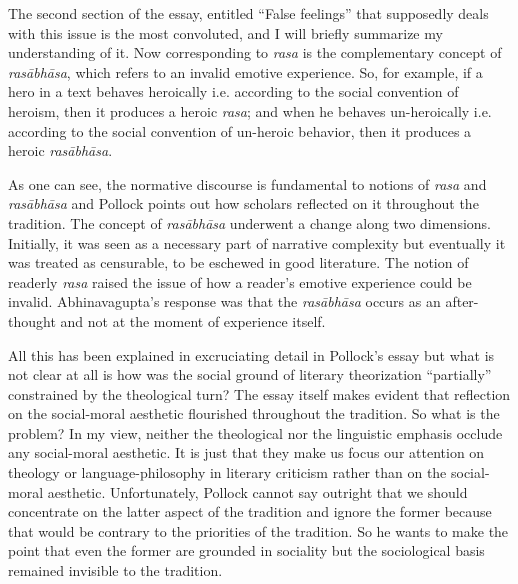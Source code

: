 The second section of the essay, entitled ``False feelings'' that supposedly deals with this issue is the most convoluted, and I will briefly summarize my understanding of it. Now corresponding to \textsl{rasa} is the complementary concept of \textsl{rasābhāsa}, which refers to an invalid emotive experience. So, for example, if a hero in a text behaves heroically i.e. according to the social convention of heroism, then it produces a heroic \textsl{rasa}; and when he behaves un-heroically i.e. according to the social convention of un-heroic behavior, then it produces a heroic \textsl{rasābhāsa}. 

As one can see, the normative discourse is fundamental to notions of \textsl{rasa} and \textsl{rasābhāsa} and Pollock points out how scholars reflected on it throughout the tradition. The concept of \textsl{rasābhāsa} underwent a change along two dimensions. Initially, it was seen as a necessary part of narrative complexity but eventually it was treated as censurable, to be eschewed in good literature. The notion of readerly \textsl{rasa} raised the issue of how a reader's emotive experience could be invalid. Abhinavagupta's response was that the \textsl{rasābhāsa} occurs as an after-thought and not at the moment of experience itself.

All this has been explained in excruciating detail in Pollock's essay but what is not clear at all is how was the social ground of literary theorization ``partially'' constrained by the theological turn? The essay itself makes evident that reflection on the social-moral aesthetic flourished throughout the tradition. So what is the problem? In my view, neither the theological nor the linguistic emphasis occlude any social-moral aesthetic. It is just that they make us focus our attention on theology or language-philosophy in literary criticism rather than on the social-moral aesthetic. Unfortunately, Pollock cannot say outright that we should concentrate on the latter aspect of the tradition and ignore the former because that would be contrary to the priorities of the tradition. So he wants to make the point that even the former are grounded in sociality but the sociological basis remained invisible to the tradition.
\vskip 2pt

